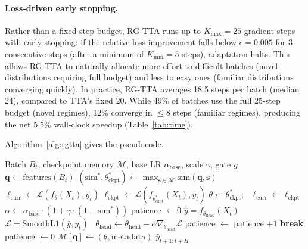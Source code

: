 \documentclass[journal]{IEEEtran}
\begin{document}
\paragraph{Loss-driven early stopping.} Rather than a fixed step budget, RG-TTA runs up to $K_{\max} = 25$ gradient steps with early stopping: if the relative loss improvement falls below $\epsilon = 0.005$ for 3 consecutive steps (after a minimum of $K_{\min} = 5$ steps), adaptation halts. This allows RG-TTA to naturally allocate more effort to difficult batches (novel distributions requiring full budget) and less to easy ones (familiar distributions converging quickly). In practice, RG-TTA averages 18.5 steps per batch (median 24), compared to TTA's fixed 20. While 49\% of batches use the full 25-step budget (novel regimes), 12\% converge in $\leq$8 steps (familiar regimes), producing the net 5.5\% wall-clock speedup (Table~\ref{tab:time}).

Algorithm~\ref{alg:rgtta} gives the pseudocode.

\begin{algorithm}[t]
\caption{RG-TTA: Regime-Guided Test-Time Adaptation}
\label{alg:rgtta}
\begin{algorithmic}[1]
\REQUIRE Batch $B_t$, checkpoint memory $\mathcal{M}$, base LR $\alpha_{\text{base}}$, scale $\gamma$, gate $g$
\STATE $\mathbf{q} \leftarrow \text{features}(B_t)$ \hfill {}
\STATE $(\text{sim}^*, \theta^*_{\text{ckpt}}) \leftarrow \max_{\mathbf{s} \in \mathcal{M}} \text{sim}(\mathbf{q}, \mathbf{s})$ \hfill {}
\STATE $\ell_{\text{curr}} \leftarrow \mathcal{L}(f_\theta(X_t), y_t)$ \hfill {}
  \STATE $\ell_{\text{ckpt}} \leftarrow \mathcal{L}(f_{\theta^*_{\text{ckpt}}}(X_t), y_t)$
    \STATE $\theta \leftarrow \theta^*_{\text{ckpt}}$; \, $\ell_{\text{curr}} \leftarrow \ell_{\text{ckpt}}$
  \ENDIF
\ENDIF
\STATE $\alpha \leftarrow \alpha_{\text{base}} \cdot (1 + \gamma \cdot (1 - \text{sim}^*))$ \hfill {}
\STATE patience $\leftarrow 0$
  \STATE $\hat{y} = f_{\theta_{\text{head}}}(X_t)$ \hfill {}
  \STATE $\mathcal{L} = \text{SmoothL1}(\hat{y}, y_t)$~\cite{huber1964robust} \hfill {}
  \STATE $\theta_{\text{head}} \leftarrow \theta_{\text{head}} - \alpha \nabla_{\theta_{\text{head}}} \mathcal{L}$
    \STATE patience $\leftarrow$ patience $+ 1$
      \STATE \textbf{break} \hfill {}
    \ENDIF
  \ELSE
    \STATE patience $\leftarrow 0$
  \ENDIF
\ENDFOR
\STATE $\mathcal{M}[\mathbf{q}] \leftarrow (\theta, \text{metadata})$ \hfill {}
\RETURN $\hat{y}_{t+1:t+H}$
\end{algorithmic}
\end{algorithm}
\end{document}
